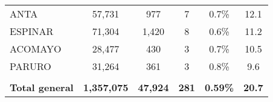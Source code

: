 \begin{tabular}{lccccc}
		\cellcolor[HTML]{FFFF99}ANTA                                    & 57,731               & 977                                  & 7                    & 0.7\%                      & 12.1                                        \\
		\cellcolor[HTML]{FFFF99}ESPINAR                                 & 71,304               & 1,420                                & 8                    & 0.6\%                      & 11.2                                        \\
		\cellcolor[HTML]{FFFF99}ACOMAYO                                 & 28,477               & 430                                  & 3                    & 0.7\%                      & 10.5                                        \\
		\cellcolor[HTML]{FFFF99}PARURO                                  & 31,264               & 361                                  & 3                    & 0.8\%                      & 9.6                                         \\
		& \multicolumn{1}{l}{} & \multicolumn{1}{l}{}                 & \multicolumn{1}{l}{} & \multicolumn{1}{l}{}       & \multicolumn{1}{l}{}                        \\
		\rowcolor[HTML]{DDEBF7} 
		\textbf{Total general}                                          & \textbf{1,357,075}   & \textbf{47,924}                      & \textbf{281}         & \textbf{0.59\%}            & \textbf{20.7}                              
	\end{tabular}